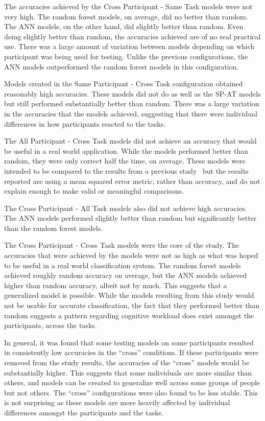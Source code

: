 \documentclass[11pt]{article}
\begin{document}
	The accuracies achieved by the Cross Participant - Same Task models were not very high. The random forest models, on average, did no better than random. The ANN models, on the other hand, did slightly better than random. Even doing slightly better than random, the accuracies achieved are of no real practical use. There was a large amount of variation between models depending on which participant was being used for testing. Unlike the previous configurations, the ANN models outperformed the random forest models in this configuration.
	
	Models created in the Same Participant - Cross Task configuration obtained reasonably high accuracies. These models did not do as well as the SP-AT models but still performed substantially better than random. There was a large variation in the accuracies that the models achieved, suggesting that there were individual differences in how participants reacted to the tasks. 
	
	The All Participant - Cross Task models did not achieve an accuracy that would be useful in a real world application. While the models performed better than random, they were only correct half the time, on average. These models were intended to be compared to the results from a previous study~\cite{Ke} but the results reported are using a mean squared error metric, rather than accuracy, and do not explain enough to make valid or meaningful comparisons. 
	
	The Cross Participant - All Task models also did not achieve high accuracies. The ANN models performed slightly better than random but significantly better than the random forest models. 
	
	The Cross Participant - Cross Task models were the core of the study. The accuracies that were achieved by the models were not as high as what was hoped to be useful in a real world classification system. The random forest models achieved roughly random accuracy on average, but the ANN models achieved higher than random accuracy, albeit not by much. This suggests that a generalized model is possible. While the models resulting from this study would not be usable for accurate classification, the fact that they performed better than random suggests a pattern regarding cognitive workload does exist amongst the participants, across the tasks. 
	
	In general, it was found that some testing models on some participants resulted in consistently low accuracies in the ``cross'' conditions. If these participants were removed from the study results, the accuracies of the ``cross'' models would be substantially higher. This suggests that some individuals are more similar than others, and models can be created to generalize well across some groups of people but not others. The ``cross'' configurations were also found to be less stable. This is not surprising as these models are more heavily affected by individual differences amongst the participants and the tasks. 
	
\end{document}
